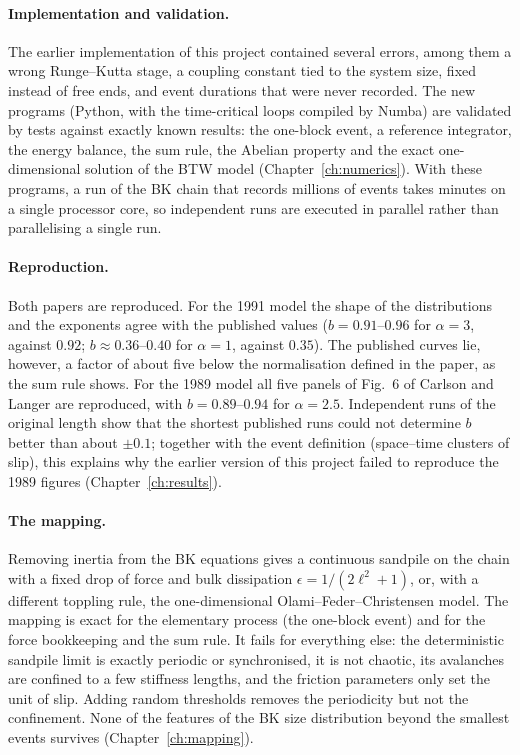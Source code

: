 \paragraph{Implementation and validation.} The earlier implementation of this project contained several errors, among them a wrong Runge--Kutta stage, a coupling
constant tied to the system size, fixed instead of free ends, and event durations that were never recorded. The new programs (Python, with the time-critical loops
compiled by Numba) are validated by tests against exactly known results: the one-block event, a reference integrator, the energy balance, the sum rule, the Abelian
property and the exact one-dimensional solution of the BTW model (Chapter~\ref{ch:numerics}). With these programs, a run of the BK chain that records millions of events
takes minutes on a single processor core, so independent runs are executed in parallel rather than parallelising a single run.

\paragraph{Reproduction.} Both papers are reproduced. For the 1991 model the shape of the distributions and the exponents agree with the published values
($b = 0.91$--$0.96$ for $\alpha = 3$, against $0.92$; $b\approx0.36$--$0.40$ for $\alpha=1$, against $0.35$). The published curves lie, however, a factor of about five
below the normalisation defined in the paper, as the sum rule shows. For the 1989 model all five panels of Fig.~6 of Carlson and Langer are reproduced, with
$b = 0.89$--$0.94$ for $\alpha = 2.5$. Independent runs of the original length show that the shortest published runs could not determine $b$ better than about
$\pm0.1$; together with the event definition (space--time clusters of slip), this explains why the earlier version of this project failed to reproduce the 1989 figures
(Chapter~\ref{ch:results}).

\paragraph{The mapping.} Removing inertia from the BK equations gives a continuous sandpile on the chain with a fixed drop of force and bulk dissipation
$\epsilon = 1/(2\ell^2+1)$, or, with a different toppling rule, the one-dimensional Olami--Feder--Christensen model. The mapping is exact for the elementary process
(the one-block event) and for the force bookkeeping and the sum rule. It fails for everything else: the deterministic sandpile limit is exactly periodic or synchronised,
it is not chaotic, its avalanches are confined to a few stiffness lengths, and the friction parameters only set the unit of slip. Adding random thresholds removes the
periodicity but not the confinement. None of the features of the BK size distribution beyond the smallest events survives (Chapter~\ref{ch:mapping}).

